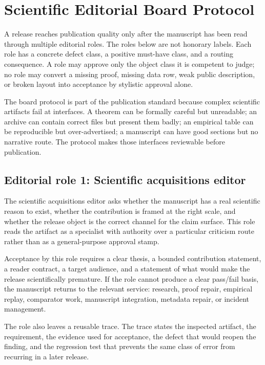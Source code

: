 \section{Scientific Editorial Board Protocol}

\label{sec:oc133-scientific-editorial-board-protocol}

A release reaches publication quality only after the manuscript has been read through multiple editorial roles. The roles below are not honorary labels. Each role has a concrete defect class, a positive must-have class, and a routing consequence. A role may approve only the object class it is competent to judge; no role may convert a missing proof, missing data row, weak public description, or broken layout into acceptance by stylistic approval alone.


The board protocol is part of the publication standard because complex scientific artifacts fail at interfaces. A theorem can be formally careful but unreadable; an archive can contain correct files but present them badly; an empirical table can be reproducible but over-advertised; a manuscript can have good sections but no narrative route. The protocol makes those interfaces reviewable before publication.


\subsection{Editorial role 1: Scientific acquisitions editor}

The scientific acquisitions editor asks whether the manuscript has a real scientific reason to exist, whether the contribution is framed at the right scale, and whether the release object is the correct channel for the claim surface. This role reads the artifact as a specialist with authority over a particular criticism route rather than as a general-purpose approval stamp.


Acceptance by this role requires a clear thesis, a bounded contribution statement, a reader contract, a target audience, and a statement of what would make the release scientifically premature. If the role cannot produce a clear pass/fail basis, the manuscript returns to the relevant service: research, proof repair, empirical replay, comparator work, manuscript integration, metadata repair, or incident management.


The role also leaves a reusable trace. The trace states the inspected artifact, the requirement, the evidence used for acceptance, the defect that would reopen the finding, and the regression test that prevents the same class of error from recurring in a later release.


